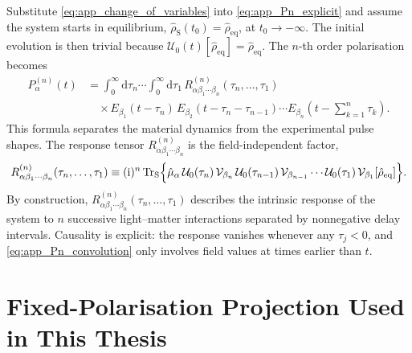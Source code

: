 Substitute \autoref{eq:app_change_of_variables} into \autoref{eq:app_Pn_explicit} and assume the system starts in equilibrium, $\hat{\rho}_{\mathrm{S}}(t_0)=\hat{\rho}_{\mathrm{eq}}$, at $t_0\to -\infty$. The initial evolution is then trivial because $\mathcal{U}_0(t)[\hat{\rho}_{\mathrm{eq}}]=\hat{\rho}_{\mathrm{eq}}$. The $n$-th order polarisation becomes
\begin{equation}
\begin{split}
P^{(n)}_\alpha(t)
&= \int_{0}^{\infty}\!\mathrm{d}\tau_n\cdots\int_{0}^{\infty}\!\mathrm{d}\tau_1\,
R^{(n)}_{\alpha\beta_1\cdots\beta_n}(\tau_n,\ldots,\tau_1)
\\
&\quad \times
E_{\beta_1}(t-\tau_n)\,
E_{\beta_2}(t-\tau_n-\tau_{n-1})\cdots
E_{\beta_n}\!\left(t-\sum_{k=1}^{n}\tau_k\right).
\end{split}
\label{eq:app_Pn_convolution}
\end{equation}
This formula separates the material dynamics from the experimental pulse shapes. The response tensor $R^{(n)}_{\alpha\beta_1\cdots\beta_n}$ is the field-independent factor,
\begin{equation*}
	R^{(n)}_{\alpha\beta_1\cdots\beta_n}(\tau_n,\ldots,\tau_1)
	\equiv (\mathrm{i})^n\,\mathrm{Tr}_{\mathrm{S}}\Bigl\{\hat{\mu}_\alpha\,\mathcal{U}_0(\tau_n)\,\mathcal{V}_{\beta_n}\,\mathcal{U}_0(\tau_{n-1})\,\mathcal{V}_{\beta_{n-1}}\cdots\mathcal{U}_0(\tau_1)\,\mathcal{V}_{\beta_1}[\hat{\rho}_{\mathrm{eq}}]\Bigr\}.
\end{equation*}
By construction, $R^{(n)}_{\alpha\beta_1\cdots\beta_n}(\tau_n,\ldots,\tau_1)$ describes the intrinsic response of the system to $n$ successive light--matter interactions separated by nonnegative delay intervals. Causality is explicit: the response vanishes whenever any $\tau_j<0$, and \autoref{eq:app_Pn_convolution} only involves field values at times earlier than $t$.

\section{Fixed-Polarisation Projection Used in This Thesis}
\label{app:sec:scalar_projection_note}

